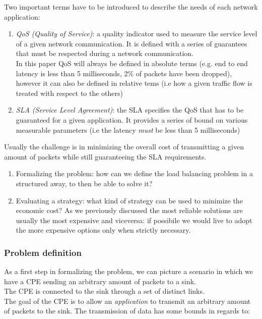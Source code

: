 \documentclass{report}
\begin{document}
 Two important terms have to be introduced to describe the needs of each network application:
 \begin{enumerate}
 	\item \textit{QoS (Quality of Service)}: a quality indicator used to measure the service level of a given network communication.  It is defined with a series of guarantees that must be respected during a network communication. \\
 	In this paper QoS will always be defined in absolute terms (e.g. end to end latency is less than 5 milliseconds,  2\% of packets have been dropped), however it can also be defined in relative tems (i.e how a given traffic flow is   treated with respect to the others)
 	\item \textit{SLA (Service Level Agreement)}: the SLA specifies the QoS that has to be guaranteed for a given application. It provides a series of bound on various measurable parameters (i.e the latency \textit{must} be less than 5 milliseconds)
 \end{enumerate}
 
 Usually the challenge is in minimizing the overall cost of transmitting a given amount of packets while still guaranteeing  the SLA requirements.
 \begin{enumerate}
 	\item Formalizing the problem: how can we define the load balancing problem in a structured away, to then be able to solve it?
 	\item Evaluating a strategy: what kind of strategy can be used to minimize the economic cost? As we previously discussed the most reliable solutions are usually the most expensive and viceversa: if possibile we would live to adopt the more expensive options only when strictly necessary.
 \end{enumerate}
 
\subsubsection{Problem definition}

As a first step in formalizing the problem,  we can picture a scenario in which we have a CPE sending an arbitrary amount of packets to a sink. \\

The CPE is connected to the sink through a set of distinct links. \\

The goal of the CPE is to allow an \textit{application} to  transmit an arbitrary amount of packets to the sink. The transmission of data has some bounds in regards to:
\end{document}
